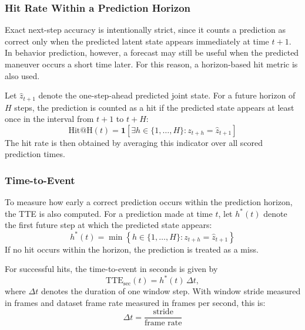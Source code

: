 \subsubsection{Hit Rate Within a Prediction Horizon}

Exact next-step accuracy is intentionally strict, since it counts a prediction as correct only when the predicted latent state appears 
immediately at time $t+1$. 
In behavior prediction, however, a forecast may still be useful when the predicted maneuver occurs a short time later. 
For this reason, a horizon-based hit metric is also used.

\par Let $\hat{z}_{t+1}$ denote the one-step-ahead predicted joint state. 
For a future horizon of $H$ steps, the prediction is counted as a hit if the predicted state appears at least once in the interval 
from $t+1$ to $t+H$:
\begin{equation}
\mathrm{Hit@H}(t)
=
\mathbf{1}\!\left[
\exists h \in \{1,\dots,H\}
:
z_{t+h} = \hat{z}_{t+1}
\right]
\end{equation}
The hit rate is then obtained by averaging this indicator over all scored prediction times.

\subsubsection{Time-to-Event}

To measure how early a correct prediction occurs within the prediction horizon, the \ac{TTE} is also computed. 
For a prediction made at time $t$, let $h^\ast(t)$ denote the first future step at which the predicted state appears:
\begin{equation}
h^\ast(t)
=
\min
\left\{
h \in \{1,\dots,H\}
:
z_{t+h} = \hat{z}_{t+1}
\right\}
\end{equation}
If no hit occurs within the horizon, the prediction is treated as a miss.

\par For successful hits, the time-to-event in seconds is given by
\begin{equation}
\mathrm{TTE}_{\mathrm{sec}}(t)
=
h^\ast(t)\,\Delta t,
\end{equation}
where $\Delta t$ denotes the duration of one window step. 
With window stride measured in frames and dataset frame rate measured in frames per second, this is:
\begin{equation}
\Delta t
=
\frac{\text{stride}}{\text{frame rate}}
\end{equation}

